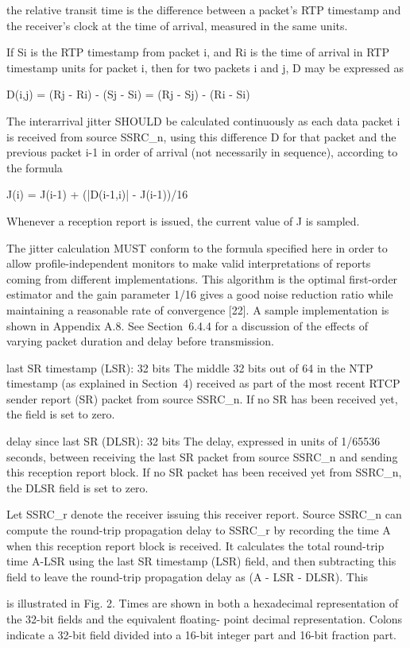 \documentclass{article}
\begin{document}
the relative transit time is the difference between a packet's RTP timestamp and the receiver's clock at the time of arrival, measured in the same units.

If Si is the RTP timestamp from packet i, and Ri is the time of arrival in RTP timestamp units for packet i, then for two packets i and j, D may be expressed as

D(i,j) = (Rj - Ri) - (Sj - Si) = (Rj - Sj) - (Ri - Si)

The interarrival jitter SHOULD be calculated continuously as each data packet i is received from source SSRC\_n, using this difference D for that packet and the previous packet i-1 in order of arrival (not necessarily in sequence), according to the formula

J(i) = J(i-1) + (|D(i-1,i)| - J(i-1))/16

Whenever a reception report is issued, the current value of J is sampled.

The jitter calculation MUST conform to the formula specified here in order to allow profile-independent monitors to make valid interpretations of reports coming from different implementations. This algorithm is the optimal first-order estimator and the gain parameter 1/16 gives a good noise reduction ratio while maintaining a reasonable rate of convergence [22].  A sample implementation is shown in Appendix A.8.  See Section~6.4.4 for a discussion of the effects of varying packet duration and delay before transmission.

last SR timestamp (LSR): 32 bits The middle 32 bits out of 64 in the NTP timestamp (as explained in Section~4) received as part of the most recent RTCP sender report (SR) packet from source SSRC\_n.  If no SR has been received yet, the field is set to zero.

delay since last SR (DLSR): 32 bits The delay, expressed in units of 1/65536 seconds, between receiving the last SR packet from source SSRC\_n and sending this reception report block.  If no SR packet has been received yet from SSRC\_n, the DLSR field is set to zero.

Let SSRC\_r denote the receiver issuing this receiver report. Source SSRC\_n can compute the round-trip propagation delay to SSRC\_r by recording the time A when this reception report block is received.  It calculates the total round-trip time A-LSR using the last SR timestamp (LSR) field, and then subtracting this field to leave the round-trip propagation delay as (A - LSR - DLSR).  This

is illustrated in Fig. 2.  Times are shown in both a hexadecimal representation of the 32-bit fields and the equivalent floating- point decimal representation.  Colons indicate a 32-bit field divided into a 16-bit integer part and 16-bit fraction part.
\end{document}
